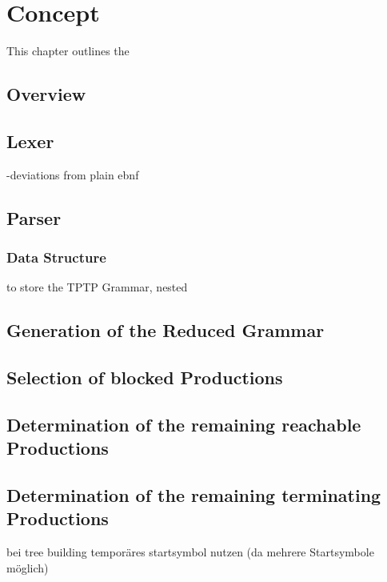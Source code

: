 
\chapter{Concept}\label{cha:Concept}
This chapter outlines the 
\section{Overview}\label{sec:ConceptOverview}

\section{Lexer}
-deviations from plain ebnf
\section{Parser}
\subsection{Data Structure}
to store the \ac{TPTP} Grammar, nested
\section{Generation of the Reduced Grammar}\label{sec:ConceptGenerateReducedGrammar}

\section{Selection of blocked Productions}

\section{Determination of the remaining reachable Productions}

\section{Determination of  the remaining terminating Productions}


bei tree building temporäres startsymbol nutzen (da mehrere Startsymbole möglich)

